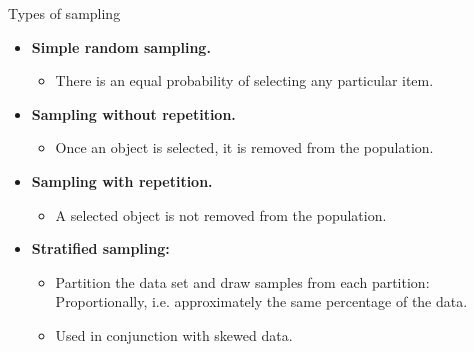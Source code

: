 \documentclass[aspectratio=169,t]{beamer}
\begin{document}
  { 
    \begin{frame}{Types of sampling}
        \begin{itemize}
            \item \textbf{Simple random sampling.}
            \begin{itemize}
              \item There is an equal probability of selecting any particular item.
            \end{itemize}
            \item \textbf{Sampling without repetition.}
            \begin{itemize}
              \item Once an object is selected, it is removed from the population.
            \end{itemize}
            \item \textbf{Sampling with repetition.}
            \begin{itemize}
              \item A selected object is not removed from the population.
            \end{itemize}
            \item \textbf{Stratified sampling:}
            \begin{itemize}
              \item Partition the data set and draw samples from each partition: Proportionally, i.e. approximately the same percentage of the data.
              \item Used in conjunction with skewed data.
            \end{itemize}
        \end{itemize}
    \end{frame}
  }
\end{document}
